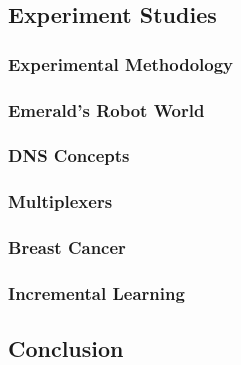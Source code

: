 \documentclass[../main.tex]{subfiles}
\begin{document}
\subsection{Experiment Studies}

\subsubsection{Experimental Methodology}

\subsubsection{Emerald's Robot World}

\subsubsection{DNS Concepts}

\subsubsection{Multiplexers}

\subsubsection{Breast Cancer}

\subsubsection{Incremental Learning}

\subsection{Conclusion}
\end{document}

